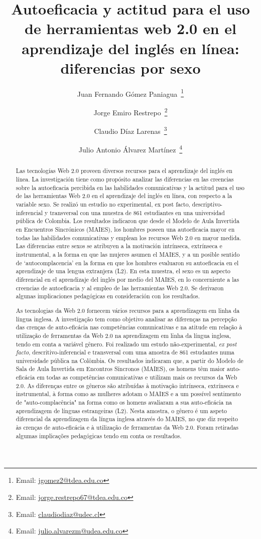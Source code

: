 \documentclass[spanish]{textolivre}
\title{Autoeficacia y actitud para el uso de herramientas web 2.0 en el aprendizaje del inglés en línea: diferencias por sexo}
\author[1]{Juan Fernando Gómez Paniagua~\orcid{0000-0003-1004-6793}\thanks{Email: \href{mailto:jgomez2@tdea.edu.co}{jgomez2@tdea.edu.co}}}
\author[1]{Jorge Emiro Restrepo~\orcid{0000-0001-8790-7454}\thanks{Email: \href{mailto:jorge.restrepo67@tdea.edu.co}{jorge.restrepo67@tdea.edu.co}}}
\author[2]{Claudio Díaz Larenas~\orcid{0000-0003-2394-2378}\thanks{Email: \href{mailto:claudiodiaz@udec.cl}{claudiodiaz@udec.cl}}}
\author[3]{Julio Antonio Álvarez Martínez~\orcid{0000-0001-9481-7422}\thanks{Email: \href{mailto:julio.alvarezm@udea.edu.co}{julio.alvarezm@udea.edu.co}}}
\affil[1]{Tecnológico de Antioquia, Institución Universitaria, Departamento de Ciencias Básicas y Áreas Comunes, Medellín, Colombia.}
\affil[2]{Universidad de Concepción, Facultad de Educación, Departamento de Curriculum e Instrucción, Bío Bío, Chile.}
\affil[3]{Universidad de Antioquia, Escuela de Idiomas, Medellín, Colombia.}
\begin{document}
\maketitle
\begin{polyabstract}
\begin{abstract}
Las tecnologías Web 2.0 proveen diversos recursos para el aprendizaje del inglés en línea. La investigación tiene como propósito analizar las diferencias en las creencias sobre la autoeficacia percibida en las habilidades comunicativas y la actitud para el uso de las herramientas Web 2.0 en el aprendizaje del inglés en línea, con respecto a la variable sexo. Se realizó un estudio no experimental, ex post facto, descriptivo-inferencial y transversal con una muestra de 861 estudiantes en una universidad pública de Colombia. Los resultados indicaron que desde el Modelo de Aula Invertida en Encuentros Sincrónicos (MAIES), los hombres poseen una autoeficacia mayor en todas las habilidades comunicativas y emplean los recursos Web 2.0 en mayor medida. Las diferencias entre sexos se atribuyen a la motivación intrínseca, extrínseca e instrumental, a la forma en que las mujeres asumen el MAIES, y a un posible sentido de ‘autocomplacencia’ en la forma en que los hombres evaluaron su autoeficacia en el aprendizaje de una lengua extranjera (L2). En esta muestra, el sexo es un aspecto diferencial en el aprendizaje del inglés por medio del MAIES, en lo concerniente a las creencias de autoeficacia y al empleo de las herramientas Web 2.0. Se derivaron algunas implicaciones pedagógicas en consideración con los resultados.

\end{abstract}

\begin{portuguese}
\begin{abstract}
As tecnologias da Web 2.0 fornecem vários recursos para a aprendizagem em linha da língua inglesa. A investigação tem como objetivo analisar as diferenças na percepção das crenças de auto-eficácia nas competências comunicativas e na atitude em relação à utilização de ferramentas da Web 2.0 na aprendizagem em linha da língua inglesa, tendo em conta a variável gênero. Foi realizado um estudo não-experimental, \textit{ex post facto}, descritivo-inferencial e transversal com uma amostra de 861 estudantes numa universidade pública na Colômbia. Os resultados indicaram que, a partir do Modelo de Sala de Aula Invertida em Encontros Síncronos (MAIES), os homens têm maior auto-eficácia em todas as competências comunicativas e utilizam mais os recursos da Web 2.0. As diferenças entre os gêneros são atribuídas à motivação intrínseca, extrínseca e instrumental, à forma como as mulheres adotam o MAIES e a um possível sentimento de "auto-complacência" na forma como os homens avaliaram a sua auto-eficácia na aprendizagem de línguas estrangeiras (L2). Nesta amostra, o gênero é um aspeto diferencial da aprendizagem da língua inglesa através do MAIES, no que diz respeito às crenças de auto-eficácia e à utilização de ferramentas da Web 2.0. Foram retiradas algumas implicações pedagógicas tendo em conta os resultados.


\end{abstract}
\end{portuguese}
\end{polyabstract}
\end{document}
